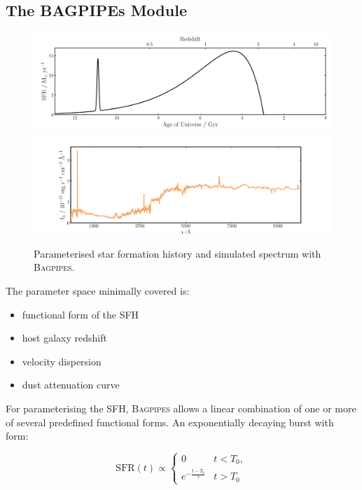 \documentclass[a4paper,11pt]{article}
\begin{document}
\subsection{The BAGPIPEs Module}\label{sec:bagpipes_module}

\begin{figure}[H]
  \includegraphics[width=\textwidth]{alex_model_20_sfh}
  \includegraphics[width=\textwidth]{alex_model_20_spec}
  \caption{Parameterised star formation history and simulated spectrum with \textsc{Bagpipes}.}
  \label{fig:bagpipes_example_simulation}
\end{figure}

The parameter space minimally covered is:

\begin{itemize}
  \item functional form of the SFH
  \item host galaxy redshift
  \item velocity dispersion
  \item dust attenuation curve
\end{itemize}

\noindent For parameterising the SFH, \textsc{Bagpipes} allows a linear combination of one or more of several predefined functional forms. An exponentially decaying burst with form:

\begin{equation}
  \mathrm{SFR}(t) \propto
  \begin{cases}
    0 & t < T_0, \\
    e^{-\frac{t-T_0}{\tau}} & t > T_0
  \end{cases}
\end{equation}
\end{document}
